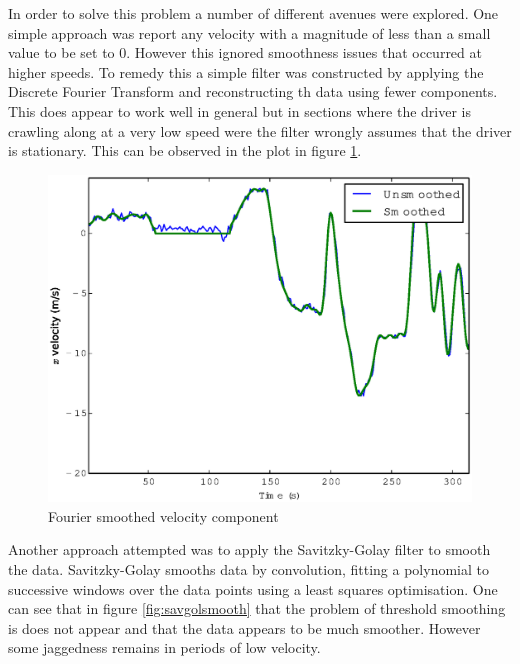 \documentclass[a4paper, 11pt, twocolumn]{report}
\begin{document}
In order to solve this problem a number of different avenues were explored.
One simple approach was report any velocity with a magnitude of less than a small value to be set to 0.
However this ignored smoothness issues that occurred at higher speeds.
To remedy this a simple filter was constructed by applying the Discrete Fourier Transform and reconstructing th data using fewer components.
This does appear to work well in general but in sections where the driver is crawling along at a very low speed were the filter wrongly assumes that the driver is stationary.
This can be observed in the plot in figure \ref{fig:fouriersmooth}.

\begin{figure}[h]
    \center
    \includegraphics[width=\linewidth]{fouriersmooth}
    \caption{Fourier smoothed velocity component}
    \label{fig:fouriersmooth}
\end{figure}

Another approach attempted was to apply the Savitzky-Golay filter to smooth the data.
Savitzky-Golay smooths data by convolution, fitting a polynomial to successive windows over the data points using a least squares optimisation.
One can see that in figure \ref{fig:savgolsmooth} that the problem of threshold smoothing is does not appear and that the data appears to be much smoother.
However some jaggedness remains in periods of low velocity.
\end{document}
